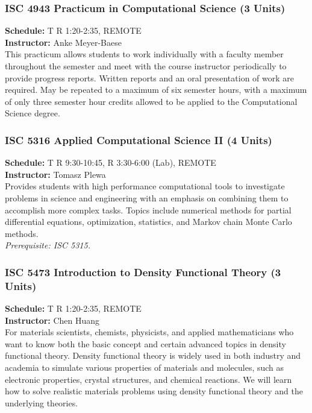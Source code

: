\documentclass[12pt,a4paper]{article}
\begin{document}
\subsubsection*{ISC 4943 Practicum in Computational Science (3 Units)}
\textbf{Schedule:} T R 1:20-2:35, REMOTE \\
\textbf{Instructor:} Anke Meyer-Baese \\
This practicum allows students to work individually with a faculty member throughout the semester and meet with the course instructor periodically to provide progress reports. Written reports and an oral presentation of work are required. May be repeated to a maximum of six semester hours, with a maximum of only three semester hour credits allowed to be applied to the Computational Science degree.

\subsubsection*{ISC 5316 Applied Computational Science II (4 Units)}
\textbf{Schedule:} T R 9:30-10:45, R 3:30-6:00 (Lab), REMOTE \\
\textbf{Instructor:} Tomasz Plewa \\
Provides students with high performance computational tools to investigate problems in science and engineering with an emphasis on combining them to accomplish more complex tasks. Topics include numerical methods for partial differential equations, optimization, statistics, and Markov chain Monte Carlo methods. \\
\textit{Prerequisite: ISC 5315.}

\subsubsection*{ISC 5473 Introduction to Density Functional Theory (3 Units)}
\textbf{Schedule:} T R 1:20-2:35, REMOTE \\
\textbf{Instructor:} Chen Huang \\
For materials scientists, chemists, physicists, and applied mathematicians who want to know both the basic concept and certain advanced topics in density functional theory. Density functional theory is widely used in both industry and academia to simulate various properties of materials and molecules, such as electronic properties, crystal structures, and chemical reactions. We will learn how to solve realistic materials problems using density functional theory and the underlying theories.
\end{document}
